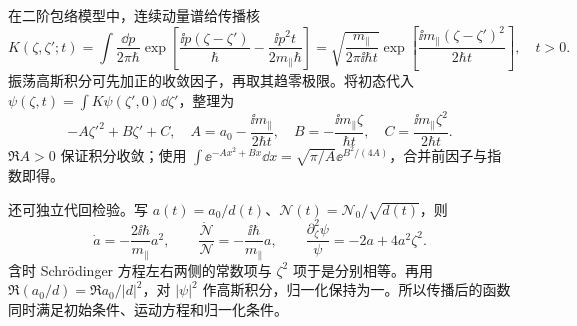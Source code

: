 \begin{derivation}[高斯波包的自由传播与方程核对]
在二阶包络模型中，连续动量谱给传播核
\begin{equation*}
 K(\zeta,\zeta';t)=\int\frac{\dd p}{2\pi\hbar}
 \exp\!\left[\frac{\ii p(\zeta-\zeta')}{\hbar}
             -\frac{\ii p^2t}{2m_\parallel\hbar}\right]
 =\sqrt{\frac{m_\parallel}{2\pi\ii\hbar t}}
 \exp\!\left[\frac{\ii m_\parallel(\zeta-\zeta')^2}{2\hbar t}\right],
 \quad t>0.
\end{equation*}
振荡高斯积分可先加正的收敛因子，再取其趋零极限。将初态代入 $\psi(\zeta,t)=\int K\psi(\zeta',0)\dd\zeta'$，整理为
\begin{equation*}
 -A\zeta'^2+B\zeta'+C,
 \quad A=a_0-\frac{\ii m_\parallel}{2\hbar t},\quad
 B=-\frac{\ii m_\parallel\zeta}{\hbar t},\quad
 C=\frac{\ii m_\parallel\zeta^2}{2\hbar t}.
\end{equation*}
$\Re A>0$ 保证积分收敛；使用 $\int\ee^{-Ax^2+Bx}\dd x=\sqrt{\pi/A}\ee^{B^2/(4A)}$，合并前因子与指数即得。

还可独立代回检验。写 $a(t)=a_0/d(t)$、$\mathcal N(t)=\mathcal N_0/\sqrt{d(t)}$，则
\begin{equation*}
 \dot a=-\frac{2\ii\hbar}{m_\parallel}a^2,\qquad
 \frac{\dot{\mathcal N}}{\mathcal N}=-\frac{\ii\hbar}{m_\parallel}a,
 \qquad
 \frac{\partial_\zeta^2\psi}{\psi}=-2a+4a^2\zeta^2.
\end{equation*}
含时 Schrödinger 方程左右两侧的常数项与 $\zeta^2$ 项于是分别相等。再用
$\Re(a_0/d)=\Re a_0/|d|^2$，对 $|\psi|^2$ 作高斯积分，归一化保持为一。所以传播后的函数同时满足初始条件、运动方程和归一化条件。
\end{derivation}











